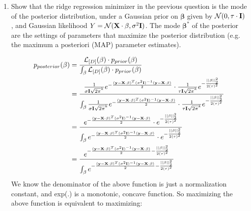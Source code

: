 \documentclass[11pt]{article}
\renewcommand{\vec}[1]{\mathbf{#1}}
\begin{document}
\begin{enumerate}
\begin{answertext}{10cm}{}
\end{answertext} 

\pagebreak


\item Show that the ridge regression minimizer in the previous question is the mode of the posterior distribution, under a Gaussian prior on $\vec{\beta}$ given by ${\cal N}(0, \tau \cdot \vec{I})$, and Gaussian likelihood $Y = {\cal N}(\vec{X} \cdot \vec{\beta}, \sigma^2 \vec{I})$.  The mode $\vec{\beta}^*$ of the posterior are the settings of parameters that maximize the posterior distribution (e.g. the maximum a posteriori (MAP) parameter estimates).

\begin{answertext}{20.7cm}{}
\begin{align}
p_{posterior}{(\vec{\beta})} &= \frac{{\cal L}_{[D]}(\vec{\beta}) \cdot p_{prior}(\vec{\beta})}{\int_{\vec{\beta}} {\cal L}_{[D]}(\vec{\beta}) \cdot p_{prior}(\vec{\beta}) } \notag \\ 
&=\frac{
\frac{1}{\sigma \vec I \sqrt{2 \pi}^k } e^{-\frac{(\vec y - \vec X \cdot \vec{\beta})^{T}(\sigma^2\vec I)^{-1}(\vec y - \vec X \cdot \vec{\beta})}{2}} \cdot
\frac{1}{\tau \vec I \sqrt{2 \pi}^k} e^{-\frac{||\vec{\beta}||^{2}_{2}}{2 {(\tau)}^2}}  
}{\int_{\vec{\beta}}
\frac{1}{\sigma \vec I \sqrt{2 \pi}^k } e^{-\frac{(\vec y - \vec X \cdot \vec{\beta})^{T}(\sigma^2\vec I)^{-1}(\vec y - \vec X \cdot \vec{\beta})}{2}} \cdot
\frac{1}{\tau \vec I \sqrt{2 \pi}^k} e^{-\frac{||\vec{\beta}||^{2}_{2}}{2 {(\tau)}^2}}  
} \notag \\ 
&=\frac{
e^{-\frac{(\vec y - \vec X \cdot \vec{\beta})^{T}(\sigma^2\vec I)^{-1}(\vec y - \vec X \cdot \vec{\beta})}{2}} \cdot e^{-\frac{||\vec{\beta}||^{2}_{2}}{2 {(\tau)}^2}}  
}{\int_{\vec{\beta}}
e^{-\frac{(\vec y - \vec X \cdot \vec{\beta})^{T}(\sigma^2\vec I)^{-1}(\vec y - \vec X \cdot \vec{\beta})}{2}} \cdot e^{-\frac{||\vec{\beta}||^{2}_{2}}{2 {(\tau)}^2}}  
} \notag \\
&=\frac{
e^{-\frac{(\vec y - \vec X \cdot \vec{\beta})^{T}(\sigma^2\vec I)^{-1}(\vec y - \vec X \cdot \vec{\beta})}{2} -\frac{||\vec{\beta}||^{2}_{2}}{2 {(\tau)}^2}}  
}{\int_{\vec{\beta}}
e^{-\frac{(\vec y - \vec X \cdot \vec{\beta})^{T}(\sigma^2\vec I)^{-1}(\vec y - \vec X \cdot \vec{\beta})}{2} -\frac{||\vec{\beta}||^{2}_{2}}{2 {(\tau)}^2}}  
} \notag
\end{align}
We know the denominator of the above function is just a normalization constant, and exp(.) is a monotonic, concave function. So maximizing the above function is equivalent to maximizing:

\end{answertext}
\end{enumerate}
\end{document}
